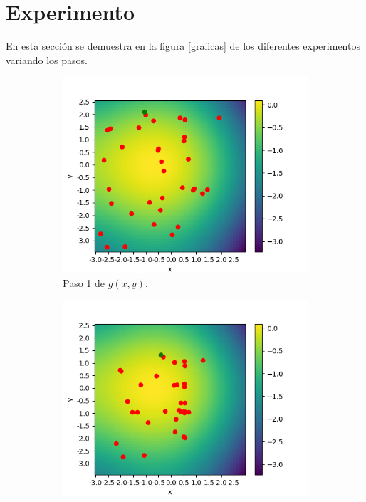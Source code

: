 \documentclass{article}
\begin{document}
\section{Experimento}

En esta sección se demuestra en la figura \ref{graficas} de los diferentes experimentos variando los pasos.

\begin{figure} [h!]
 	\centering
 	\begin{subfigure}[b]{0.40\linewidth}
 		\includegraphics[width=\linewidth]{p7_v_t01.png}
 		 \caption{Paso 1 de $g(x,y)$.}
 		\label{3d}
 	\end{subfigure}
 	\begin{subfigure}[b]{0.40\linewidth}
 		\includegraphics[width=\linewidth]{p7_v_t08.png}

\end{subfigure}
\end{figure}
\end{document}
